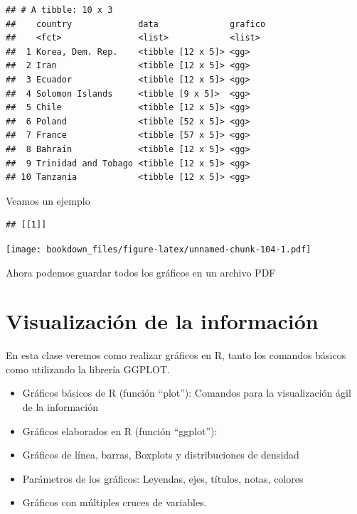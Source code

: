 \documentclass[]{book}
\newenvironment{Shaded}{\begin{snugshade}}{\end{snugshade}}
\newcommand{\DecValTok}[1]{\textcolor[rgb]{0.00,0.00,0.81}{#1}}
\newcommand{\KeywordTok}[1]{\textcolor[rgb]{0.13,0.29,0.53}{\textbf{#1}}}
\newcommand{\NormalTok}[1]{#1}
\newcommand{\OperatorTok}[1]{\textcolor[rgb]{0.81,0.36,0.00}{\textbf{#1}}}
\newcommand{\StringTok}[1]{\textcolor[rgb]{0.31,0.60,0.02}{#1}}
\providecommand{\tightlist}{%
  \setlength{\itemsep}{0pt}\setlength{\parskip}{0pt}}
\begin{document}
\begin{verbatim}
## # A tibble: 10 x 3
##    country             data              grafico
##    <fct>               <list>            <list> 
##  1 Korea, Dem. Rep.    <tibble [12 x 5]> <gg>   
##  2 Iran                <tibble [12 x 5]> <gg>   
##  3 Ecuador             <tibble [12 x 5]> <gg>   
##  4 Solomon Islands     <tibble [9 x 5]>  <gg>   
##  5 Chile               <tibble [12 x 5]> <gg>   
##  6 Poland              <tibble [52 x 5]> <gg>   
##  7 France              <tibble [57 x 5]> <gg>   
##  8 Bahrain             <tibble [12 x 5]> <gg>   
##  9 Trinidad and Tobago <tibble [12 x 5]> <gg>   
## 10 Tanzania            <tibble [12 x 5]> <gg>
\end{verbatim}

Veamos un ejemplo

\begin{Shaded}
\end{Shaded}

\begin{verbatim}
## [[1]]
\end{verbatim}

\texttt{[image: bookdown\_files/figure-latex/unnamed-chunk-104-1.pdf]}

Ahora podemos guardar todos los gráficos en un archivo PDF

\begin{Shaded}
\end{Shaded}

\hypertarget{visualizacion-de-la-informacion}{%
\chapter{Visualización de la información}\label{visualizacion-de-la-informacion}}

En esta clase veremos como realizar gráficos en R, tanto los comandos básicos como utilizando la librería GGPLOT.

\begin{itemize}
\tightlist
\item
  Gráficos básicos de R (función ``plot''): Comandos para la visualización ágil de la información
\item
  Gráficos elaborados en R (función ``ggplot''):
\item
  Gráficos de línea, barras, Boxplots y distribuciones de densidad
\item
  Parámetros de los gráficos: Leyendas, ejes, títulos, notas, colores
\item
  Gráficos con múltiples cruces de variables.
\end{itemize}
\end{document}
